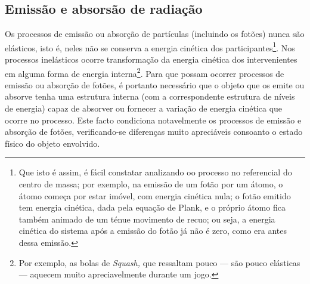 \subsection{Emissão e absorsão de radiação}
Os processos de emissão ou absorção de partículas (incluindo os fotões) nunca
são elásticos, isto é, neles não se conserva a energia cinética dos
participantes\footnote{Que isto é assim, é fácil constatar analizando oo
processo no referencial do centro de massa; por exemplo, na emissão de um fotão
por um átomo, o átomo começa por estar imóvel, com energia cinética nula; o
fotão emitido tem energia cinética, dada pela equação de Plank, e o próprio
átomo fica também animado de um ténue movimento de recuo; ou seja, a energia
cinética do sistema após a emissão do fotão já não é zero, como era antes dessa
emissão.}. Nos processos inelásticos ocorre transformação da energia cinética
dos intervenientes em alguma forma de energia interna\footnote{Por exemplo, as
bolas de \emph{Squash,} que ressaltam pouco --- são pouco elásticas --- aquecem
muito apreciavelmente durante um jogo.}. Para que possam ocorrer processos de
emissão ou absorção de fotões, é portanto necessário que o objeto que os emite
ou absorve tenha uma estrutura interna (com a correspondente estrutura de níveis
de energia) capaz de absorver ou fornecer a variação de energia cinética que
ocorre no processo. Este facto condiciona notavelmente os processos de emissão e
absorção de fotões, verificando-se diferenças muito apreciáveis consoanto o
estado físico do objeto envolvido.

